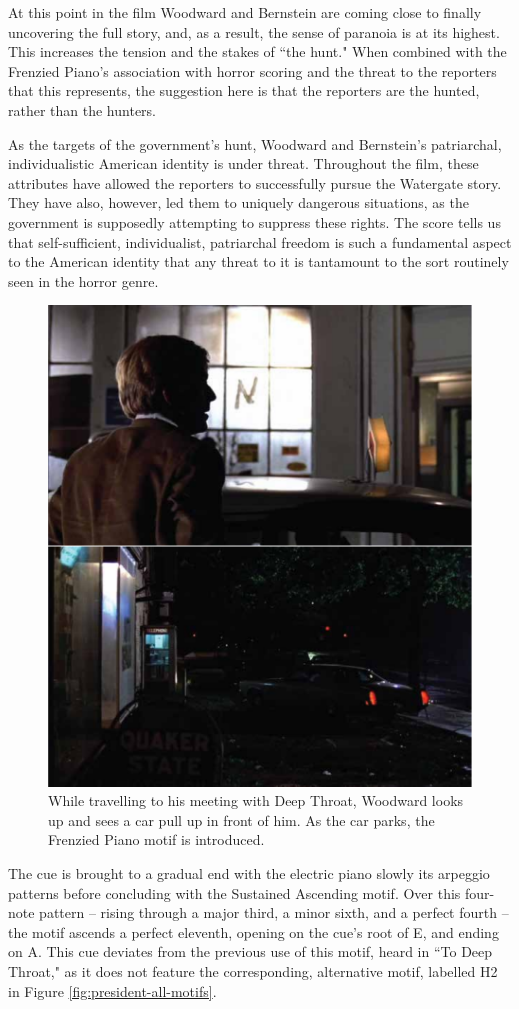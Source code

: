 At this point in the film Woodward and Bernstein are coming close to finally uncovering the full story, and, as a result, the sense of paranoia is at its highest.
This increases the tension and the stakes of ``the hunt."
When combined with the Frenzied Piano's association with horror scoring and the threat to the reporters that this represents, the suggestion here is that the reporters are the hunted, rather than the hunters.

As the targets of the government's hunt, Woodward and Bernstein's patriarchal, individualistic American identity is under threat.
Throughout the film, these attributes have allowed the reporters to successfully pursue the Watergate story.
They have also, however, led them to uniquely dangerous situations, as the government is supposedly attempting to suppress these rights.
The score tells us that self-sufficient, individualist, patriarchal freedom is such a fundamental aspect to the American identity that any threat to it is tantamount to the sort routinely seen in the horror genre.
\begin{figure}
    \centering
    \includegraphics[width=0.5\linewidth]{img/president-frenzied-intro.pdf}
    \caption{While travelling to his meeting with Deep Throat, Woodward looks up and sees a car pull up in front of him. As the car parks, the Frenzied Piano motif is introduced.}
    \label{fig:president-frenzied-intro}
\end{figure}

The cue is brought to a gradual end with the electric piano slowly its arpeggio patterns before concluding with the Sustained Ascending motif.
Over this four-note pattern – rising through a major third, a minor sixth, and a perfect fourth – the motif ascends a perfect eleventh, opening on the cue's root of E\flat, and ending on A\flat.
This cue deviates from the previous use of this motif, heard in ``To Deep Throat," as it does not feature the corresponding, alternative motif, labelled H2 in Figure \ref{fig:president-all-motifs}.

